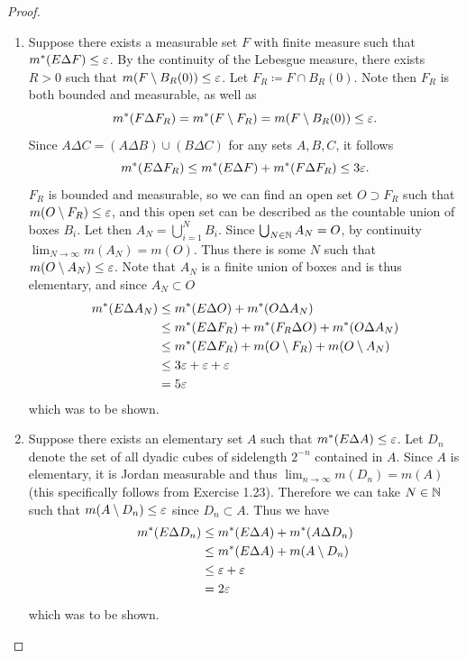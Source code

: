 \documentclass[hw_all.tex]{subfiles}
\begin{document}
\begin{proof}
\begin{enumerate}
        \item[vii $\Rightarrow$ viii)]
            Suppose there exists a measurable set $F$ with finite measure such that $m^*(E \Delta F) \leq \varepsilon$. By the continuity of the Lebesgue measure, there exists $R > 0$ such that $m(F \setminus B_R(0)) \leq \varepsilon$. Let $F_R \coloneq F \cap B_R(0)$. Note then $F_R$ is both bounded and measurable, as well as
            \[
                m^*(F \Delta F_R) = m^*(F \setminus F_R) = m(F \setminus B_R(0)) \leq \varepsilon
            .\]
            Since $A \Delta C = (A \Delta B) \cup (B \Delta C)$ for any sets $A,B,C$, it follows
            \[
                m^*(E \Delta F_R) \leq m^*(E \Delta F) + m^*(F \Delta F_R) \leq 3 \varepsilon
            .\]
            $F_R$ is bounded and measurable, so we can find an open set $O \supset F_R$ such that $m(O \setminus F_R) \leq \varepsilon$, and this open set can be described as the countable union of boxes $B_i$. Let then $A_N = \bigcup_{i = 1}^N B_i$. Since $\bigcup_{N \in \mathbb{N}} A_N = O$, by continuity $\lim_{N \to \infty} m(A_N) = m(O)$. Thus there is some $N$ such that $m(O \setminus A_N) \leq \varepsilon$. Note that $A_N$ is a finite union of boxes and is thus elementary, and since $A_N \subset O$
            \begin{align*}
                m^*(E \Delta A_N) &\leq m^*(E \Delta O) + m^*(O \Delta A_N) \\
                                  &\leq m^*(E \Delta F_R) + m^*(F_R \Delta O) + m^*(O \Delta A_N) \\
                                  &\leq m^*(E \Delta F_R) + m(O \setminus F_R) + m(O \setminus A_N) \\
                                  &\leq 3 \varepsilon + \varepsilon + \varepsilon \\
                                  &= 5\varepsilon
            \end{align*}
            which was to be shown.

        \item[viii $\Rightarrow$ ix)]
            Suppose there exists an elementary set $A$ such that $m^*(E \Delta A) \leq \varepsilon$. Let $D_n$ denote the set of all dyadic cubes of sidelength $2^{-n}$ contained in $A$. Since $A$ is elementary, it is Jordan measurable and thus $\lim_{n \to \infty} m(D_n) = m(A)$ (this specifically follows from Exercise 1.23). Therefore we can take $N \in \mathbb{N}$ such that $m(A \setminus D_n) \leq \varepsilon$ since $D_n \subset A$. Thus we have
            \begin{align*}
                m^*(E \Delta D_n) &\leq m^*(E \Delta A) + m^*(A \Delta D_n) \\
                                  &\leq m^*(E \Delta A) + m(A \setminus D_n) \\
                                  &\leq \varepsilon + \varepsilon \\
                                  &= 2\varepsilon
            \end{align*}
            which was to be shown.


\end{enumerate}
\end{proof}
\end{document}
